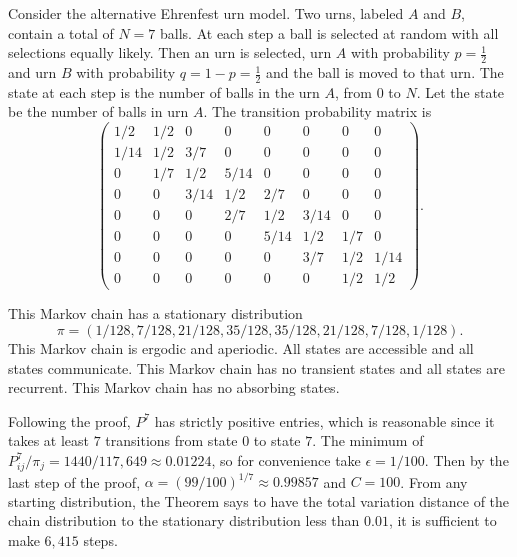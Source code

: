 \documentclass[12pt]{article}
\begin{document}
\begin{example}
    Consider the alternative Ehrenfest urn model.%
    Two urns, labeled \( A \) and \( B \), contain a total of \( N = 7 \)
    balls.  At each step a ball is selected at random with all
    selections equally likely.  Then an urn is selected, urn \( A \)
    with probability \( p = \frac{1}{2} \) and urn \( B \) with
    probability \( q = 1-p = \frac {1}{2} \) and the ball is moved to
    that urn.  The state at each step is the number of balls in the urn \(
    A \), from \( 0 \) to \( N \).  Let the state be the number of balls
    in urn \( A \).  The transition probability matrix is
    \[
        \begin{pmatrix}
          1/2 & 1/2 & 0   & 0    & 0   & 0   & 0   & 0 \\
          1/14& 1/2 & 3/7 & 0    & 0   & 0   & 0   & 0 \\
          0   & 1/7 & 1/2 & 5/14 & 0   & 0   & 0   & 0 \\
          0   & 0   &3/14 & 1/2  & 2/7 & 0   & 0   & 0 \\
          0   & 0   & 0   & 2/7  & 1/2 & 3/14& 0   & 0 \\
          0   & 0   & 0   & 0    & 5/14& 1/2 & 1/7 & 0 \\ 
          0   & 0   & 0   & 0    & 0   & 3/7 & 1/2 & 1/14 \\
          0   & 0   & 0   & 0    & 0   & 0   & 1/2 & 1/2
        \end{pmatrix}
        .
    \]

    This Markov chain has a stationary distribution
    \[
        \pi = ( 1/128,7/128,21/128,35/128,35/128,21/128,7/128,1/128 ).
    \] This Markov chain is ergodic and aperiodic.  All states are
    accessible and all states communicate.  This Markov chain has no
    transient states and all states are recurrent.  This Markov chain
    has no absorbing states.

    Following the proof, \( P^7 \) has strictly positive entries, which
    is reasonable since it takes at least \( 7 \) transitions from state
    \( 0 \) to state \( 7 \).  The minimum of \( P^7_{ij}/\pi_j =
    1440/117{,}649 \approx 0.01224 \), so for convenience take \(
    \epsilon = 1/100 \).  Then by the last
    step of the proof, \( \alpha = (99/100)^{1/7} \approx 0.99857 \) and
    \( C = 100 \).  From any starting distribution, the Theorem says to
    have the total variation distance of the chain distribution to the
    stationary distribution less than \( 0.01 \), it is sufficient to
    make \( 6{,}415 \) steps.


\end{example}
\end{document}
